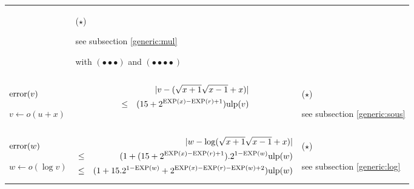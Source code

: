 \documentclass[12pt]{amsart}
\def\ulp{{\rm ulp}}
\def\Exp{{\rm EXP}}
\begin{document}
\begin{center}
\begin{tabular}{l l l}
\begin{minipage}{7.5cm}
\end{minipage} &
\begin{minipage}{6cm}

($\star$)

see subsection \ref{generic:mul}

with $(\bullet\bullet\bullet)$ and $(\bullet\bullet\bullet\bullet)$
\end{minipage}\\%
\begin{minipage}{2.5cm}
${\textnormal{error}}(v)$


$v \leftarrow o(u+x) $
\end{minipage} &
\begin{minipage}{7.5cm}

\begin{eqnarray}\nonumber
  &&|v-(\sqrt{x+1} \sqrt{x-1} +x)| \\\nonumber
  &       \leq& (15+2^{\Exp(x)-\Exp(r)+1}) \ulp(v)
\end{eqnarray}


\end{minipage} &
\begin{minipage}{6cm}

($\star$)

see subsection \ref{generic:sous}

\end{minipage}\\%
\begin{minipage}{2.5cm}
${\textnormal{error}}(w)$


$w \leftarrow o(\log{v}) $
\end{minipage} &
\begin{minipage}{7.5cm}

\begin{eqnarray}\nonumber
  &&|w-\log(\sqrt{x+1} \sqrt{x-1} +x)| \\\nonumber
  &       \leq& (1+(15+2^{\Exp(x)-\Exp(r)+1}).2^{1-\Exp(w)} \ulp(w) \\\nonumber
  &       \leq& (1+15.2^{1-\Exp(w)}+2^{\Exp(x)-\Exp(r)-\Exp(w)+2}) \ulp(w)
\end{eqnarray}


\end{minipage} &
\begin{minipage}{6cm}

($\star$)

see subsection \ref{generic:log}

\end{minipage}
\end{tabular}
\end{center}
\end{document}
